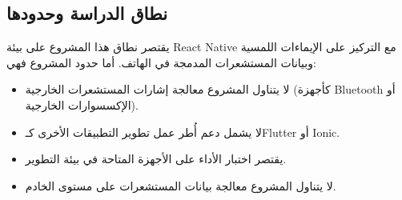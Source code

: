 \begin{Arabic}
\section{نطاق الدراسة وحدودها}

يقتصر نطاق هذا المشروع على بيئة \textenglish{React Native} مع التركيز على الإيماءات اللمسية وبيانات المستشعرات المدمجة في الهاتف. أما حدود المشروع فهي:
\begin{itemize}
    \item لا يتناول المشروع معالجة إشارات المستشعرات الخارجية (كأجهزة \textenglish{Bluetooth} أو الإكسسوارات الخارجية).
    \item لا يشمل دعم أُطر عمل تطوير التطبيقات الأخرى كـ\textenglish{Flutter} أو \textenglish{Ionic}.
    \item يقتصر اختبار الأداء على الأجهزة المتاحة في بيئة التطوير.
    \item لا يتناول المشروع معالجة بيانات المستشعرات على مستوى الخادم.
\end{itemize}

\end{Arabic}
